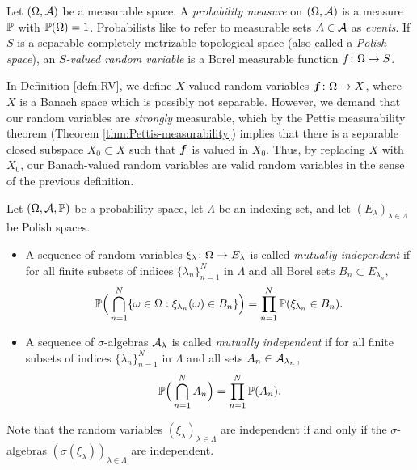 Let $(\Omega,\mc{A})$ be a measurable space.
A \emph{probability measure} on $(\Omega,\mc{A})$ is a measure $\P$ with $\P(\Omega) = 1$.
Probabilists like to refer to measurable sets $A \in \mc{A}$ as \emph{events}.
If $S$ is a separable completely metrizable topological space (also called a \emph{Polish space}), an \emph{$S$-valued random variable} is a Borel measurable function $\map{f}{\Omega}{S}$.

\begin{rmk}
  In Definition \ref{defn:RV}, we define $X$-valued random variables $\map{\mb{f}}{\Omega}{X}$, where $X$ is a Banach space which is possibly not separable.
  However, we demand that our random variables are \emph{strongly} measurable, which by the Pettis measurability theorem (Theorem \ref{thm:Pettis-measurability}) implies that there is a separable closed subspace $X_{0} \subset X$ such that $\mb{f}$ is valued in $X_{0}$.
  Thus, by replacing $X$ with $X_{0}$, our Banach-valued random variables are valid random variables in the sense of the previous definition.
\end{rmk}

\begin{defn}
  Let $(\Omega,\mc{A},\P)$ be a probability space, let $\Lambda$ be an indexing set, and let $(E_{\lambda})_{\lambda \in \Lambda}$ be Polish spaces.
  \begin{itemize}
  \item
    A sequence of random variables $\map{\xi_{\lambda}}{\Omega}{E_{\lambda}}$ is called \emph{mutually independent} if for all finite subsets of indices $\{\lambda_{n}\}_{n=1}^{N}$ in $\Lambda$ and all Borel sets $B_{n} \subset E_{\lambda_{n}}$,
    \begin{equation*}
      \P\Big(\bigcap_{n=1}^{N} \{\omega \in \Omega : \xi_{\lambda_{n}}(\omega) \in B_{n}\} \Big) = \prod_{n=1}^{N} \P(\xi_{\lambda_{n}} \in B_{n}).
    \end{equation*}

  \item
    A sequence of $\sigma$-algebras $\mc{A}_{\lambda}$ is called \emph{mutually independent} if for all finite subsets of indices $\{\lambda_{n}\}_{n=1}^{N}$ in $\Lambda$ and all sets $A_{n} \in \mc{A}_{\lambda_{n}}$,
    \begin{equation*}
      \P\Big(\bigcap_{n=1}^{N} A_{n} \Big) = \prod_{n=1}^{N} \P(A_{n}).
    \end{equation*}

  \end{itemize}
  Note that the random variables $(\xi_{\lambda})_{\lambda \in \Lambda}$ are independent if and only if the $\sigma$-algebras $(\sigma(\xi_{\lambda}))_{\lambda \in \Lambda}$ are independent.
\end{defn}

